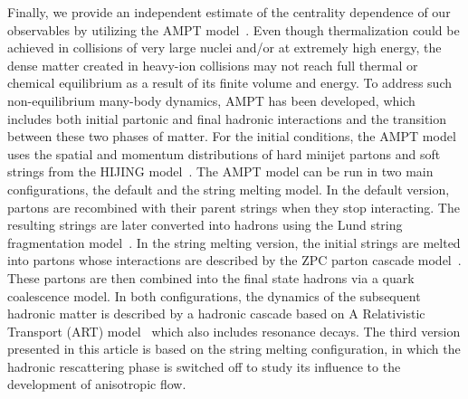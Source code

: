 
Finally, we provide an independent estimate of the centrality dependence of our observables by utilizing the {AMPT} model~\cite{Zhang:1999bd,Lin:2000cx,Lin:2004en}.
Even though thermalization could be achieved in collisions of very large nuclei and/or at extremely high energy, the dense matter created in heavy-ion collisions may not reach full thermal or chemical equilibrium as a result of its finite volume and energy. To address such non-equilibrium many-body dynamics, AMPT has been developed, which includes both initial partonic and final hadronic interactions and the transition between these two phases of matter.
For the initial conditions, the AMPT model uses the spatial and momentum distributions of hard minijet partons and soft strings from the HIJING model~\cite{Wang:1991hta,Gyulassy:1994ew}.
The AMPT model can be run in two main configurations, the default and the string melting model.
In the default version, partons are recombined with their parent strings when they stop interacting. The resulting strings are later converted into hadrons using the Lund string fragmentation model~\cite{Andersson:1986gw,NilssonAlmqvist:1986rx}. In the string melting version, the initial strings are melted into partons whose interactions are described by the ZPC parton cascade model~\cite{Zhang:1997ej}. These partons are then combined into the final state hadrons via a quark coalescence model. 
In both configurations, the dynamics of the subsequent hadronic matter is described by a hadronic cascade based on A Relativistic Transport (ART) model~\cite{Li:2001xh} which also includes resonance decays.
The third version presented in this article is based on the string melting configuration, in which the hadronic rescattering phase is switched off to study its influence to the development of anisotropic flow.
